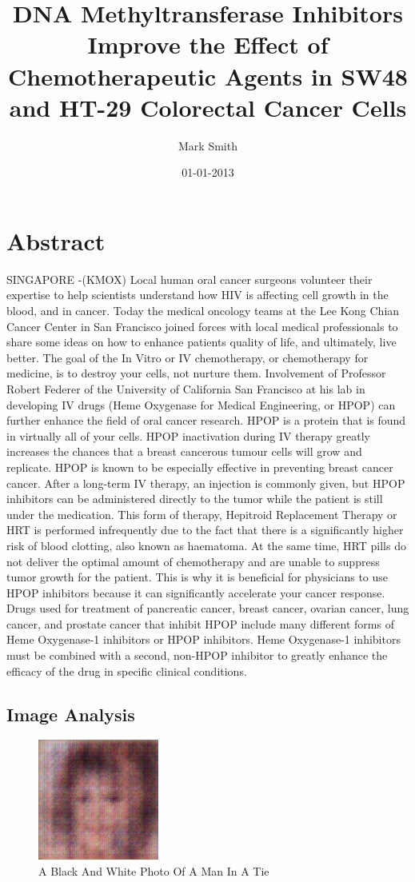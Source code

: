 \documentclass{article}%
\title{DNA Methyltransferase Inhibitors Improve the Effect of Chemotherapeutic Agents in SW48 and HT{-}29 Colorectal Cancer Cells}%
\author{Mark Smith}%
\affil{CNRS UMR 5203, INSERM U661, and Montpellier 1 \& 2 University, Institute of Functional Genomics, Montpellier, France, \newline%
    Laboratory for Diabetes Cell Therapy, Institute for Research in Biotherapy, University Hospital St{-}Eloi, Montpellier, France}%
\date{01{-}01{-}2013}%
\begin{document}
%
\normalsize%
\maketitle%
\section{Abstract}%
\label{sec:Abstract}%
SINGAPORE {-}(KMOX)  Local human oral cancer surgeons volunteer their expertise to help scientists understand how HIV is affecting cell growth in the blood, and in cancer. Today the medical oncology teams at the Lee Kong Chian Cancer Center in San Francisco joined forces with local medical professionals to share some ideas on how to enhance patients quality of life, and ultimately, live better.\newline%
The goal of the In Vitro or IV chemotherapy, or chemotherapy for medicine, is to destroy your cells, not nurture them. Involvement of Professor Robert Federer of the University of California San Francisco at his lab in developing IV drugs (Heme Oxygenase for Medical Engineering, or HPOP) can further enhance the field of oral cancer research.\newline%
HPOP is a protein that is found in virtually all of your cells. HPOP inactivation during IV therapy greatly increases the chances that a breast cancerous tumour cells will grow and replicate. HPOP is known to be especially effective in preventing breast cancer cancer. After a long{-}term IV therapy, an injection is commonly given, but HPOP inhibitors can be administered directly to the tumor while the patient is still under the medication. This form of therapy, Hepitroid Replacement Therapy or HRT is performed infrequently due to the fact that there is a significantly higher risk of blood clotting, also known as haematoma. At the same time, HRT pills do not deliver the optimal amount of chemotherapy and are unable to suppress tumor growth for the patient. This is why it is beneficial for physicians to use HPOP inhibitors because it can significantly accelerate your cancer response.\newline%
Drugs used for treatment of pancreatic cancer, breast cancer, ovarian cancer, lung cancer, and prostate cancer that inhibit HPOP include many different forms of Heme Oxygenase{-}1 inhibitors or HPOP inhibitors. Heme Oxygenase{-}1 inhibitors must be combined with a second, non{-}HPOP inhibitor to greatly enhance the efficacy of the drug in specific clinical conditions.

%
\subsection{Image Analysis}%
\label{subsec:ImageAnalysis}%


\begin{figure}[h!]%
\centering%
\includegraphics[width=150px]{500_fake_images/samples_5_183.png}%
\caption{A Black And White Photo Of A Man In A Tie}%
\end{figure}

%
\end{document}
